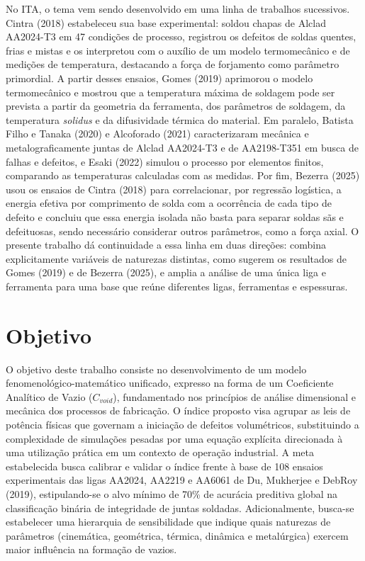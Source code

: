 \documentclass[12pt,openany]{report}
\begin{document}
No ITA, o tema vem sendo desenvolvido em uma linha de trabalhos sucessivos. Cintra (2018) estabeleceu sua base experimental: soldou chapas de Alclad AA2024-T3 em 47 condições de processo, registrou os defeitos de soldas quentes, frias e mistas e os interpretou com o auxílio de um modelo termomecânico e de medições de temperatura, destacando a força de forjamento como parâmetro primordial. A partir desses ensaios, Gomes (2019) aprimorou o modelo termomecânico e mostrou que a temperatura máxima de soldagem pode ser prevista a partir da geometria da ferramenta, dos parâmetros de soldagem, da temperatura \textit{solidus} e da difusividade térmica do material. Em paralelo, Batista Filho e Tanaka (2020) e Alcoforado (2021) caracterizaram mecânica e metalograficamente juntas de Alclad AA2024-T3 e de AA2198-T351 em busca de falhas e defeitos, e Esaki (2022) simulou o processo por elementos finitos, comparando as temperaturas calculadas com as medidas. Por fim, Bezerra (2025) usou os ensaios de Cintra (2018) para correlacionar, por regressão logística, a energia efetiva por comprimento de solda com a ocorrência de cada tipo de defeito e concluiu que essa energia isolada não basta para separar soldas sãs e defeituosas, sendo necessário considerar outros parâmetros, como a força axial. O presente trabalho dá continuidade a essa linha em duas direções: combina explicitamente variáveis de naturezas distintas, como sugerem os resultados de Gomes (2019) e de Bezerra (2025), e amplia a análise de uma única liga e ferramenta para uma base que reúne diferentes ligas, ferramentas e espessuras.

\section{Objetivo}

O objetivo deste trabalho consiste no desenvolvimento de um modelo fenomenológico\hyp{}matemático unificado, expresso na forma de um Coeficiente Analítico de Vazio ($C_{void}$), fundamentado nos princípios de análise dimensional e mecânica dos processos de fabricação. O índice proposto visa agrupar as leis de potência físicas que governam a iniciação de defeitos volumétricos, substituindo a complexidade de simulações pesadas por uma equação explícita direcionada à uma utilização prática em um contexto de operação industrial. A meta estabelecida busca calibrar e validar o índice frente à base de 108 ensaios experimentais das ligas AA2024, AA2219 e AA6061 de Du, Mukherjee e DebRoy (2019), estipulando-se o alvo mínimo de 70\% de acurácia preditiva global na classificação binária de integridade de juntas soldadas. Adicionalmente, busca-se estabelecer uma hierarquia de sensibilidade que indique quais naturezas de parâmetros (cinemática, geométrica, térmica, dinâmica e metalúrgica) exercem maior influência na formação de vazios.
\end{document}
